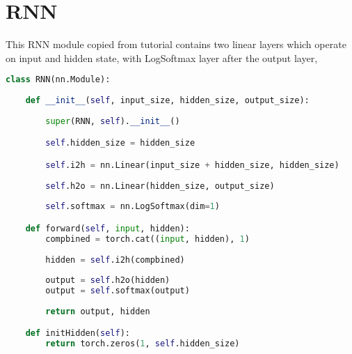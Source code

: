 \section{\acf{RNN}}
This \acs*{RNN} module copied from \parencite{sean} tutorial contains two linear layers which operate on input and hidden state, with LogSoftmax layer after the output layer,
\begin{lstlisting}[language=Python,label=productnametotensor, caption={\acf{RNN} class}]
class RNN(nn.Module):
        
    def __init__(self, input_size, hidden_size, output_size):
        
        super(RNN, self).__init__()

        self.hidden_size = hidden_size

        self.i2h = nn.Linear(input_size + hidden_size, hidden_size)
        
        self.h2o = nn.Linear(hidden_size, output_size)
        
        self.softmax = nn.LogSoftmax(dim=1)

    def forward(self, input, hidden):
        compbined = torch.cat((input, hidden), 1)
        
        hidden = self.i2h(compbined)
        
        output = self.h2o(hidden)
        output = self.softmax(output)
        
        return output, hidden

    def initHidden(self):
        return torch.zeros(1, self.hidden_size)
\end{lstlisting}
